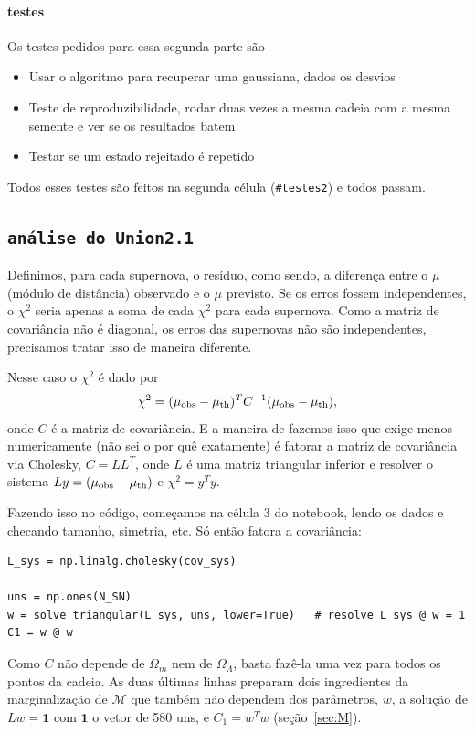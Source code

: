 \documentclass[11pt,a4paper]{article}
\newcommand{\Om}{\Omega_m}
\newcommand{\OL}{\Omega_\Lambda}
\newcommand{\M}{\mathcal{M}}
\begin{document}
\paragraph{testes} Os testes pedidos para essa segunda parte são
\begin{itemize}
  \item Usar o algoritmo para recuperar uma gaussiana, dados os desvios
  \item Teste de reproduzibilidade, rodar duas vezes a mesma cadeia com a mesma semente e ver se os resultados batem
  \item Testar se um estado rejeitado é repetido
\end{itemize}

Todos esses testes são feitos na segunda célula (\texttt{\#testes2}) e todos passam.

\subsection{\texttt{análise do Union2.1}}
\label{sec:like}

Definimos, para cada supernova, o resíduo, como sendo, a diferença entre o $\mu$ (módulo de distância) observado e 
o $\mu$ previsto. Se os erros fossem independentes, o $\chi^2$ seria apenas a soma de
cada $\chi^2$ para cada supernova. Como a matriz de covariância não é diagonal, os erros das supernovas
não são independentes, precisamos tratar isso de maneira diferente.

Nesse caso o $\chi^2$ é dado por
\begin{equation}
  \chi^2=(\mu_{\rm obs}-\mu_{\rm th})^T C^{-1}(\mu_{\rm obs}-\mu_{\rm th}),
\end{equation}
onde $C$ é a matriz de covariância. E a maneira de fazemos isso que exige menos numericamente (não sei o por quê exatamente)
é fatorar a matriz de covariância via Cholesky, $C=LL^T$, onde $L$ é uma matriz
triangular inferior e resolver o sistema $Ly = (\mu_{\rm obs}-\mu_{\rm th})$ e $\chi^2=y^Ty$.

Fazendo isso no código, começamos na célula 3 do notebook, lendo os dados 
e checando tamanho, simetria, etc. Só então fatora a covariância:
\begin{lstlisting}
L_sys = np.linalg.cholesky(cov_sys)           

uns = np.ones(N_SN)
w = solve_triangular(L_sys, uns, lower=True)   # resolve L_sys @ w = 1
C1 = w @ w
\end{lstlisting}
Como $C$ não depende de $\Om$ nem de
$\OL$, basta fazê-la uma vez para todos os pontos da cadeia. As duas últimas linhas preparam dois ingredientes
da marginalização de $\M$ que também não dependem dos parâmetros, $w$, a solução
de $Lw = \mathbf{1}$ com $\mathbf{1}$ o vetor de 580 uns, e $C_1 = w^Tw$
(seção~\ref{sec:M}).
\end{document}
